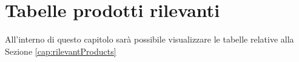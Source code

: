\chapter{Tabelle prodotti rilevanti}		
\label{cap:Tabelle}
	All'interno di questo capitolo sarà possibile visualizzare le tabelle relative alla Sezione \ref{cap:rilevantProducts}
